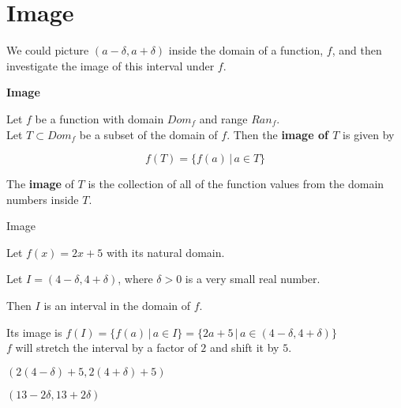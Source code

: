 \documentclass{ximera}
\begin{document}
\section*{Image}


We could picture $(a-\delta, a+\delta)$ inside the domain of a function, $f$, and then investigate the image of this interval under $f$.  







\begin{definition} \textbf{\textcolor{green!50!black}{Image}}

Let $f$ be a function with domain $Dom_f$ and range $Ran_f$. \\
Let $T \subset Dom_f$ be a subset of the domain of $f$.  Then the \textbf{image of $T$} is given by

\[       f(T) = \{   f(a)  \, | \, a \in T            \}             \]


The \textbf{image} of $T$ is the collection of all of the function values from the domain numbers inside $T$.


\end{definition}














\begin{example} Image

Let $f(x) = 2x + 5$ with its natural domain.

Let  $I = (4-\delta, 4+\delta)$, where $\delta > 0$ is a very small real number.

Then $I$ is an interval in the domain of $f$.


Its image is $f(I) = \{   f(a)  \, | \, a \in I \}  = \{   2a+5  \, | \, a \in (4-\delta, 4+\delta) \}$  \\



$f$ will stretch the interval by a factor of $2$ and shift it by $5$.


$(2(4-\delta)+5, 2(4+\delta)+5)$


$(13-2\delta, 13+2\delta)$






\end{example}
\end{document}
